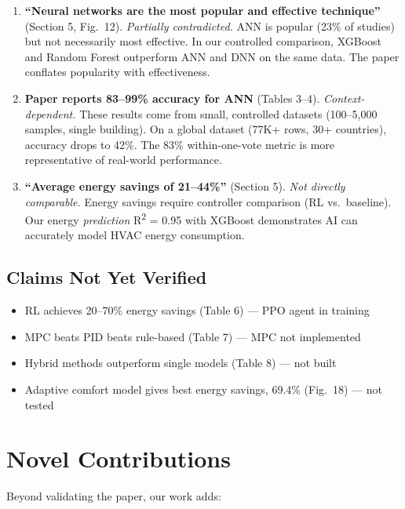 \documentclass[11pt,a4paper]{article}
\begin{document}
\begin{enumerate}
    \item \textbf{``Neural networks are the most popular and effective technique''} (Section 5, Fig.\ 12). \textit{Partially contradicted.} ANN is popular (23\% of studies) but not necessarily most effective. In our controlled comparison, XGBoost and Random Forest outperform ANN and DNN on the same data. The paper conflates popularity with effectiveness.

    \item \textbf{Paper reports 83--99\% accuracy for ANN} (Tables 3--4). \textit{Context-dependent.} These results come from small, controlled datasets (100--5,000 samples, single building). On a global dataset (77K+ rows, 30+ countries), accuracy drops to 42\%. The 83\% within-one-vote metric is more representative of real-world performance.

    \item \textbf{``Average energy savings of 21--44\%''} (Section 5). \textit{Not directly comparable.} Energy savings require controller comparison (RL vs.\ baseline). Our energy \textit{prediction} R\textsuperscript{2} = 0.95 with XGBoost demonstrates AI can accurately model HVAC energy consumption.
\end{enumerate}

\subsection{Claims Not Yet Verified}

\begin{itemize}
    \item RL achieves 20--70\% energy savings (Table 6) --- PPO agent in training
    \item MPC beats PID beats rule-based (Table 7) --- MPC not implemented
    \item Hybrid methods outperform single models (Table 8) --- not built
    \item Adaptive comfort model gives best energy savings, 69.4\% (Fig.\ 18) --- not tested
\end{itemize}

\section{Novel Contributions}

Beyond validating the paper, our work adds:
\end{document}
